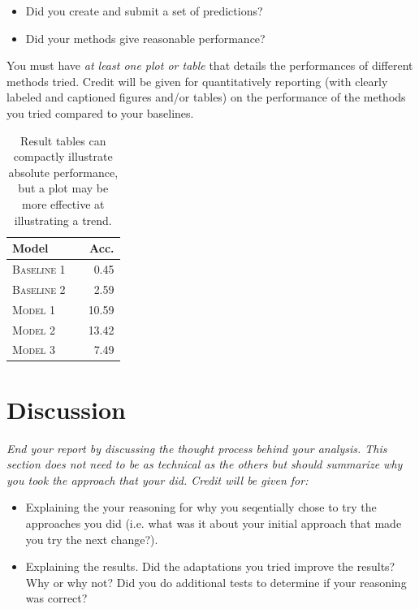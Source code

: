 \documentclass[11pt]{article}
\begin{document}
{\itshape
\begin{itemize}
\item Did you create and submit a set of
  predictions? 
  

\item  Did your methods give reasonable performance?  
\end{itemize}

\noindent You must have \textit{at least one plot or table}
that details the performances of different methods tried. 
Credit will be given for quantitatively reporting (with clearly
labeled and captioned figures and/or tables) on the performance of the
methods you tried compared to your baselines.



\begin{table}
\centering
\begin{tabular}{llr}
 \toprule
 Model &  & Acc. \\
 \midrule
 \textsc{Baseline 1} & & 0.45\\
 \textsc{Baseline 2} & & 2.59 \\
 \textsc{Model 1} & & 10.59  \\
 \textsc{Model 2} & &13.42 \\
 \textsc{Model 3} & & 7.49\\
 \bottomrule
\end{tabular}
\caption{\label{tab:results} Result tables can compactly illustrate absolute performance, but a plot may be more effective at illustrating a trend.}
\end{table}
}


\section{Discussion} 

{\itshape
End your report by discussing the thought process behind your
analysis. This section does not need to be as technical as the others 
but should summarize why you took the approach that your did. Credit will be given for:

  \begin{itemize}
  \item Explaining the your reasoning for why you seqentially chose to
    try the approaches you did (i.e. what was it about your initial
    approach that made you try the next change?).  
  \item Explaining the results.  Did the adaptations you tried improve
    the results?  Why or why not?  Did you do additional tests to
    determine if your reasoning was correct?  
  \end{itemize}
 }
\end{document}
